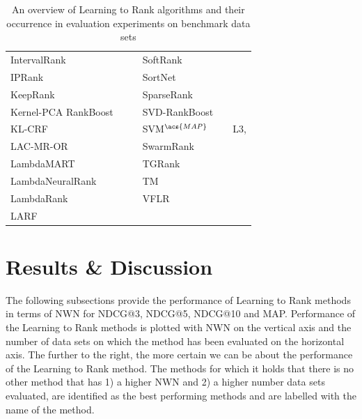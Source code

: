 \begin{table}[!h!p]
{\begin{tabular}{|l|l|l||l|l|l|}
IntervalRank & \cite{Moon2010} & \cite{Moon2010, Freno2011} & SoftRank & \cite{Taylor2008, Guiver2008} & \cite{Qin2010b} \\ 
\acs{IP}Rank & \cite{Wang2009b} & \cite{Wang2009b, Torkestani2012} & SortNet & \cite{Rigutini2008} & \cite{Rigutini2008,Freno2011} \\
KeepRank & \cite{Chen2009} & \cite{Chen2009} & SparseRank & \cite{Lai2013b} & \cite{Lai2013b} \\ 
Kernel-\acs{PCA} RankBoost & \cite{Duh2008} & \cite{Duh2008, Sato2013} & \acs{SVD}-RankBoost & \cite{Lin2009} & \cite{Lin2009} \\
KL-\acs{CRF} & \cite{Volkovs2011} & \cite{Volkovs2011} & \acs{SVM}$^{\acs{MAP}}$ & \cite{Yue2007} & L3, \cite{Wang2012, Xu2008, Niu2012} \\ 
LAC-MR-OR & \cite{Veloso2008} & \cite{Veloso2008} & SwarmRank & \cite{Diaz-Aviles2009} & \cite{Sato2013} \\ 
LambdaMART & \cite{Burges2010} & \cite{Asadi2013a, Ganjisaffar2011c} & TGRank & \cite{Lai2013} & \cite{Lai2013} \\ 
LambdaNeuralRank & \cite{Papini2012} & \cite{Papini2012} & TM & \cite{Zhou2008} & \cite{Zhou2008, Papini2012, Tan2013} \\ 
LambdaRank & \cite{Burges2006} &  & VFLR & \cite{Cai2012} & \cite{Cai2012} \\ 
LARF & \cite{Torkestani2012} & \cite{Torkestani2012} &  &  &  \\ 
\end{tabular}}
\caption{An overview of Learning to Rank algorithms and their occurrence in evaluation experiments on benchmark data sets}
\label{tab:ltr_methods_used}
\end{table}

\section{Results \& Discussion}
The following subsections provide the performance of Learning to Rank methods in terms of \ac{NWN} for \ac{NDCG}@3, \ac{NDCG}@5, \ac{NDCG}@10 and \ac{MAP}. Performance of the Learning to Rank methods is plotted with \ac{NWN} on the vertical axis and the number of data sets on which the method has been evaluated on the horizontal axis. The further to the right, the more certain we can be about the performance of the Learning to Rank method. The methods for which it holds that there is no other method that has 1) a higher \ac{NWN} and 2) a higher number data sets evaluated, are identified as the best performing methods and are labelled with the name of the method.

